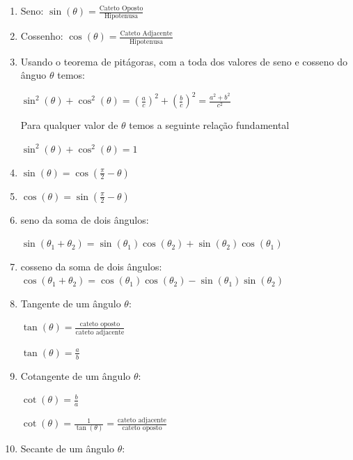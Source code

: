 \begin{multicols*}{2}
\begin{tikzpicture}[x=0.75pt,y=0.75pt,yscale=-1,xscale=1]
    
    \end{tikzpicture}
    
        \begin{enumerate}
        \item Seno: $\sin(\theta) = \frac{ \mbox{Cateto Oposto}}{\mbox{Hipotenusa}}$
        \item Cossenho: $\cos( \theta ) = \frac{ \mbox{Cateto Adjacente}}{\mbox{Hipotenusa}}$
        \item Usando o teorema de pitágoras, com a toda dos valores de seno e cosseno do ânguo $\theta$ 		temos:
        
        $\sin^2(\theta) + \cos^2(\theta) =  \left( \frac{a}{c} \right)^2 + \left(  \frac{b}{c} \right)^2 =
         \frac{a^2 + b^2}{c^2}$
         
         Para qualquer valor de $\theta$ temos a seguinte relação fundamental
         
         $\sin^2 (\theta) + \cos^2(\theta) = 1$
         
         \item $\sin(\theta)  = \cos \left( \frac{\pi}{2} - \theta\right)$
         \item $\cos(\theta)  = \sin \left( \frac{\pi}{2} - \theta\right)$
         \item seno da soma de dois ângulos:
         
         $\sin(\theta_1 + \theta_2) = \sin(\theta_1) \cos(\theta_2) + \sin( \theta_2) \cos(\theta_1)$
         
         \item cosseno da soma de dois ângulos:
         $\cos(\theta_1 + \theta_2) = \cos(\theta_1) \cos(\theta_2) - \sin(\theta_1) \sin(\theta_2)$
         
         \item Tangente de um ângulo $\theta$:
         
         $\tan(\theta) = \frac{\mbox{cateto oposto} }{\mbox{cateto adjacente}}$
         
         $\tan(\theta) = \frac{a}{b}$
         
         \item Cotangente de um ângulo $\theta$:
         
         $\cot(\theta) = \frac{b}{a}$
         
         $\cot(\theta) = \frac{1}{\tan(\theta)} = \frac{\mbox{cateto adjacente}}{\mbox{cateto oposto}}$
         
         \item Secante de um ângulo $\theta$:
         

\end{enumerate}
\end{multicols*}
